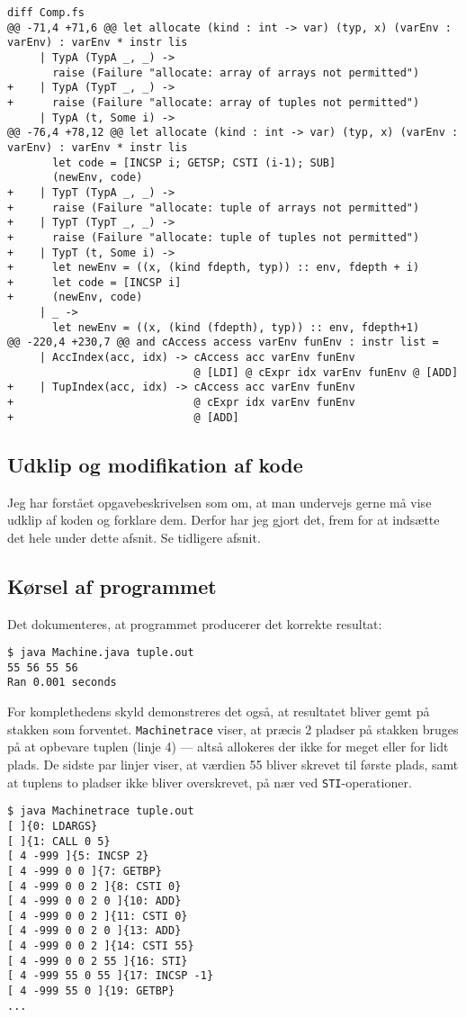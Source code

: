 \begin{verbatim}
diff Comp.fs
@@ -71,4 +71,6 @@ let allocate (kind : int -> var) (typ, x) (varEnv : varEnv) : varEnv * instr lis
     | TypA (TypA _, _) -> 
       raise (Failure "allocate: array of arrays not permitted")
+    | TypA (TypT _, _) ->
+      raise (Failure "allocate: array of tuples not permitted")
     | TypA (t, Some i) ->   
@@ -76,4 +78,12 @@ let allocate (kind : int -> var) (typ, x) (varEnv : varEnv) : varEnv * instr lis
       let code = [INCSP i; GETSP; CSTI (i-1); SUB]
       (newEnv, code)
+    | TypT (TypA _, _) ->
+      raise (Failure "allocate: tuple of arrays not permitted")
+    | TypT (TypT _, _) ->
+      raise (Failure "allocate: tuple of tuples not permitted")
+    | TypT (t, Some i) ->
+      let newEnv = ((x, (kind fdepth, typ)) :: env, fdepth + i)
+      let code = [INCSP i]
+      (newEnv, code)
     | _ -> 
       let newEnv = ((x, (kind (fdepth), typ)) :: env, fdepth+1)
@@ -220,4 +230,7 @@ and cAccess access varEnv funEnv : instr list =
     | AccIndex(acc, idx) -> cAccess acc varEnv funEnv 
                             @ [LDI] @ cExpr idx varEnv funEnv @ [ADD]
+    | TupIndex(acc, idx) -> cAccess acc varEnv funEnv
+                            @ cExpr idx varEnv funEnv
+                            @ [ADD]
\end{verbatim}

\subsection{Udklip og modifikation af kode}

Jeg har forstået opgavebeskrivelsen som om, at man undervejs gerne må vise udklip af koden og forklare dem. Derfor har jeg gjort det, frem for at indsætte det hele under dette afsnit. Se tidligere afsnit.

\subsection{Kørsel af programmet}

Det dokumenteres, at programmet producerer det korrekte resultat:

\begin{verbatim}
$ java Machine.java tuple.out
55 56 55 56
Ran 0.001 seconds
\end{verbatim}

For komplethedens skyld demonstreres det også, at resultatet bliver gemt på stakken som forventet. \texttt{Machinetrace} viser, at præcis 2 pladser på stakken bruges på at opbevare tuplen (linje 4) --- altså allokeres der ikke for meget eller for lidt plads. De sidste par linjer viser, at værdien 55 bliver skrevet til første plads, samt at tuplens to pladser ikke bliver overskrevet, på nær ved \texttt{STI}-operationer.

\begin{verbatim}
$ java Machinetrace tuple.out
[ ]{0: LDARGS}
[ ]{1: CALL 0 5}
[ 4 -999 ]{5: INCSP 2}
[ 4 -999 0 0 ]{7: GETBP}
[ 4 -999 0 0 2 ]{8: CSTI 0}
[ 4 -999 0 0 2 0 ]{10: ADD}
[ 4 -999 0 0 2 ]{11: CSTI 0}
[ 4 -999 0 0 2 0 ]{13: ADD}
[ 4 -999 0 0 2 ]{14: CSTI 55}
[ 4 -999 0 0 2 55 ]{16: STI}
[ 4 -999 55 0 55 ]{17: INCSP -1}
[ 4 -999 55 0 ]{19: GETBP}
...
\end{verbatim}

